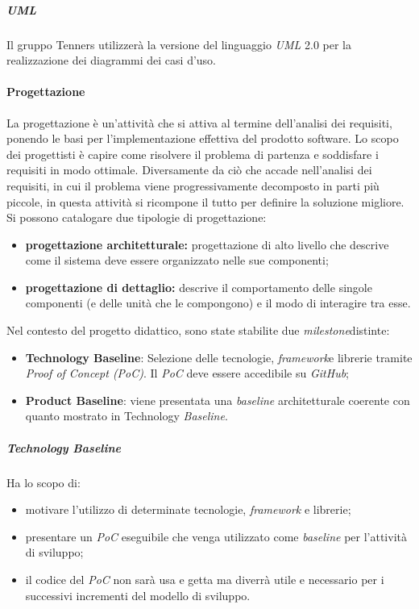 \subparagraph*{UML\glo}
Il gruppo Tenners utilizzerà la versione del linguaggio \textit{UML\glo} 2.0 per la realizzazione dei diagrammi dei casi d'uso.
\paragraph{Progettazione}
La progettazione è un'attività che si attiva al termine dell'analisi dei requisiti, ponendo le basi per l'implementazione effettiva del prodotto software. Lo scopo dei progettisti è capire come risolvere il problema di partenza e soddisfare i requisiti in modo ottimale. Diversamente da ciò che accade nell'analisi dei requisiti, in cui il problema viene progressivamente decomposto in parti più piccole, in questa attività si ricompone il tutto per definire la soluzione migliore. Si possono catalogare due tipologie di progettazione:
\begin{itemize}
	\item \textbf{progettazione architetturale:} progettazione di alto livello che descrive come il sistema deve essere organizzato nelle sue componenti;
	\item \textbf{progettazione di dettaglio:} descrive il comportamento delle singole componenti (e delle unità che le compongono) e il modo di interagire tra esse.
\end{itemize}
Nel contesto del progetto didattico, sono state stabilite due \textit{milestone}\glo distinte:
\begin{itemize}
	\item \textbf{Technology Baseline\glos}: Selezione delle tecnologie, \textit{framework}\glo e librerie tramite \textit{Proof of Concept (PoC)\glos}. Il \textit{PoC\glo} deve essere accedibile su \textit{GitHub\glos};
	\item \textbf{Product Baseline}: viene presentata una \textit{baseline\glo} architetturale coerente con quanto mostrato in Technology \textit{Baseline\glos}.
\end{itemize}
\subparagraph*{Technology Baseline\glo}
Ha lo scopo di:
\begin{itemize}
	\item motivare l'utilizzo di determinate tecnologie, \textit{framework\glo} e librerie;
	\item presentare un \textit{PoC\glo} eseguibile che venga utilizzato come \textit{baseline\glo} per l'attività di sviluppo;
	\item il codice del \textit{PoC\glo} non sarà usa e getta ma diverrà utile e necessario per i successivi incrementi del modello di sviluppo.
\end{itemize}
